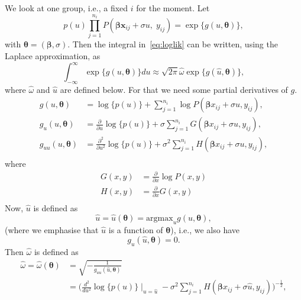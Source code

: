 \documentclass[a4paper,11pt]{article}
\newcommand{\bx}{\ensuremath{\mathbf{x}}}
\newcommand{\bb}{\ensuremath{\boldsymbol{\beta}}}
\newcommand{\btheta}{\ensuremath{\boldsymbol{\theta}}}
\newcommand{\Py}{\ensuremath{P(\bb\bx_{ij} + \sigma u, \; y_{ij})}}
\newcommand{\be}{\begin{equation}}
\newcommand{\ee}{\end{equation}}
\begin{document}
We look at one
group, i.e., a fixed $i$ for the moment. Let
\begin{equation*}
p(u) \prod_{j = 1}^{n_i} \Py = \exp\{g(u, \btheta)\},
\end{equation*}
with $\btheta = (\bb, \sigma)$. Then the integral in~\eqref{eq:loglik} can
be written, using the Laplace approximation, as
\begin{equation*}
\int_{-\infty}^{\infty} \exp\{g(u, \btheta)\} du \approx \sqrt{2
  \pi}\hat{\omega} \exp\{g(\hat{u}, \btheta)\},
\end{equation*}
where $\hat{\omega}$ and $\hat{u}$ are defined below. For that we need
some partial derivatives of $g$.
\begin{equation}\label{eq:gder}
\begin{split}
g(u, \btheta) &= \log\{p(u)\} + \sum_{j=1}^{n_i} \log
P(\bb x_{ij} + \sigma u, y_{ij}), \\
g_u(u, \btheta) &= \frac{\partial}{\partial u}\log\{p(u)\}
 + \sigma \sum _{j=1}^{n_i} 
G(\bb x_{ij} + \sigma u, y_{ij}), \\
g_{uu}(u, \btheta) &= \frac{\partial^2}{\partial u^2}\log\{p(u)\} + \sigma^2 \sum _{j=1}^{n_i} 
H(\bb x_{ij} + \sigma u, y_{ij}), \\
\end{split}
\end{equation}
where 
\be
\begin{split}
G(x, y) &= \frac{\partial}{\partial x} \log P(x, y) \\
H(x, y) &= \frac{\partial}{\partial x} G(x, y) \\
\end{split}
\ee
Now, $\hat{u}$ is defined as 
\begin{equation}\label{eq:equhat}
\hat{u} = \hat{u}(\btheta) = \text{argmax}_u g(u, \btheta),
\end{equation}
(where we emphasise that $\hat{u}$ is a function of $\btheta$), i.e., we
also have 
\begin{equation}\label{eq:uhat}
g_u(\hat{u}, \btheta) = 0.
\end{equation}
Then $\hat{\omega}$ is defined as
\begin{equation}\label{eq:sigmahat}
\begin{split}
\hat{\omega} = \hat{\omega}(\btheta) &= \sqrt{-\frac{1}{g_{uu}(\hat{u},
    \btheta)}} \\ 
&= \biggl(\frac{d^2}{du^2} \log\{p(u)\}\mid_{u=\hat{u}} - \sigma^2 \sum _{j=1}^{n_i}
H(\bb x_{ij} + \sigma \hat{u}, y_{ij})\biggr)^{-\frac{1}{2}},
\end{split}
\end{equation}
\end{document}
